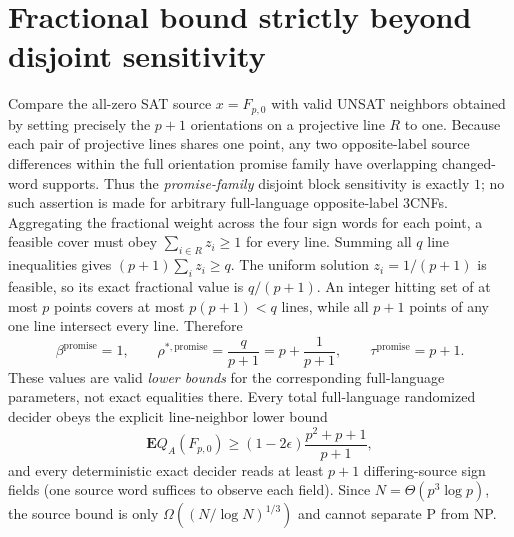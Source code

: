 \documentclass[11pt]{article}
\begin{document}
\section{Fractional bound strictly beyond disjoint sensitivity}
Compare the all-zero SAT source $x=F_{p,0}$ with valid UNSAT neighbors obtained by setting precisely the $p+1$ orientations on a projective line $R$ to one. Because each pair of projective lines shares one point, any two opposite-label source differences within the full orientation promise family have overlapping changed-word supports. Thus the \emph{promise-family} disjoint block sensitivity is exactly $1$; no such assertion is made for arbitrary full-language opposite-label 3CNFs.
Aggregating the fractional weight across the four sign words for each point, a feasible cover must obey
$\sum_{i\in R}z_i\ge1$ for every line. Summing all $q$ line inequalities gives
$(p+1)\sum_i z_i\ge q$. The uniform solution $z_i=1/(p+1)$ is feasible, so its exact fractional value is $q/(p+1)$. An integer hitting set of at most $p$ points covers at most $p(p+1)<q$ lines, while all $p+1$ points of any one line intersect every line. Therefore
\[
\boxed{\beta^{\mathrm{promise}}=1,\qquad
\rho^{*,\mathrm{promise}}=\frac{q}{p+1}
=p+\frac1{p+1},\qquad
\tau^{\mathrm{promise}}=p+1.}
\tag{7}
\]
These values are valid \emph{lower bounds} for the corresponding full-language parameters, not exact equalities there. Every total full-language randomized decider obeys the explicit line-neighbor lower bound
\[
\boxed{\mathbf E Q_A(F_{p,0})\ge(1-2\epsilon)\frac{p^2+p+1}{p+1},}
\tag{8}
\]
and every deterministic exact decider reads at least $p+1$ differing-source sign fields (one source word suffices to observe each field). Since $N=\Theta(p^3\log p)$, the source bound is only
$\Omega((N/\log N)^{1/3})$ and cannot separate P from NP.
\end{document}
